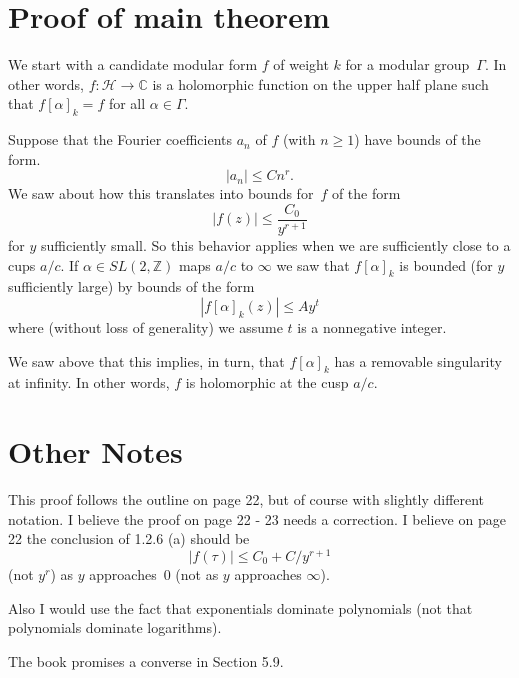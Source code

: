 \documentclass {amsart}
\theoremstyle{plain}
\theoremstyle{definition}
\theoremstyle{remark}
\newcommand{\bZ}{{\mathbb{Z}}}
\newcommand{\bC}{{\mathbb{C}}}
\newcommand{\h}{{\mathcal{H}}}
\begin{document}
\section {Proof of main theorem}

We start with a candidate modular form $f$ 
of weight $k$ for a modular group~$\Gamma$.
In other words, 
$f: \h \to \bC$ is a holomorphic function on the upper half plane 
such that $f [\alpha]_k = f$ for all $\alpha \in\Gamma$. 

Suppose that the Fourier coefficients $a_n$ of $f$ (with $n\ge 1$) have 
bounds of the form.
$$
|a_n| \le C n^r.
$$
We saw about how this translates into bounds for~$f$ of the form
$$
|f(z)| \le \frac{C_0}{y^{r+1}}
$$
for $y$ sufficiently small. So this behavior applies when we are sufficiently
close to a cups $a/c$.  If $\alpha \in SL(2, \bZ)$ maps $a/c$ to $\infty$
we saw that $f [\alpha]_k$ is bounded (for $y$ sufficiently large) by bounds of the form
$$
|f [\alpha]_k (z)| \le A y^t
$$
where (without loss of generality) we assume $t$ is a nonnegative integer.

We saw above that this implies, in turn, that $f [\alpha]_k$ has a removable singularity at infinity.
In other words, $f$ is holomorphic at the cusp $a/c$.




\section {Other Notes}

This proof follows the outline on page 22, but of course with slightly different notation.
I believe the proof on page 22 - 23 needs a correction.
I believe on page 22 the conclusion of 1.2.6 (a) should be
$$
|f(\tau)| \le C_0 + C/ y^{r+1}
$$
(not $y^r$) as $y$ approaches~$0$ (not as $y$ approaches $\infty$).

Also I would use the fact that exponentials dominate polynomials (not that polynomials dominate logarithms).

The book promises a converse in Section 5.9.
\end{document}
